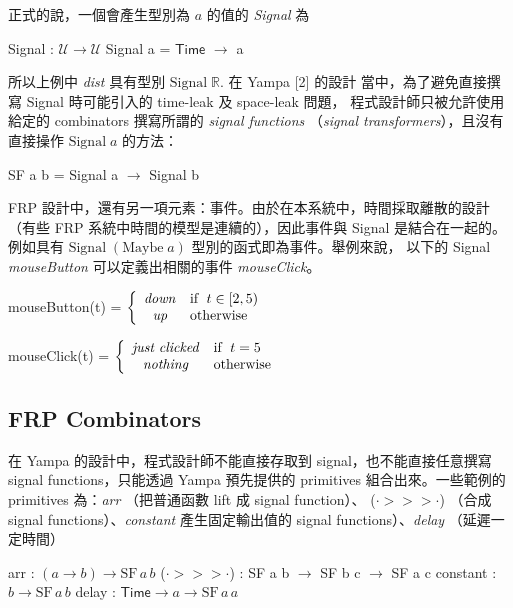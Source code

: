 \documentclass{article}
\newcommand{\Time}{\mathsf{Time}}
\newcommand{\R}{\mathbb{R}}
\newcommand{\U}{\mathcal{U}}
\begin{document}
  正式的說，一個會產生型別為 $a$ 的值的 \emph{Signal} 為

  \begin{code}
  Signal : $\U\to\U$
  Signal a = $\Time$ $\to$ a
  \end{code}

  所以上例中 \textit{dist} 具有型別 $\text{Signal}\; \R$. 在 Yampa [2] 的設計
  當中，為了避免直接撰寫 Signal 時可能引入的 time-leak 及 space-leak 問題，
  程式設計師只被允許使用給定的 combinators 撰寫所謂的 \emph{signal functions}
  （\emph{signal transformers}），且沒有直接操作 $\text{Signal}\; a$ 的方法：

  \begin{code}
  SF a b = Signal a $\to$ Signal b
  \end{code}

  FRP 設計中，還有另一項元素：事件。由於在本系統中，時間採取離散的設計
  （有些 FRP 系統中時間的模型是連續的），因此事件與 Signal 是結合在一起的。
  例如具有 $\text{Signal}\;(\text{Maybe}\;a)$ 型別的函式即為事件。舉例來說，
  以下的 Signal \textit{mouseButton} 可以定義出相關的事件
  \textit{mouseClick}。

  \begin{code}
  mouseButton(t) = $\displaystyle \left\{ \begin{array}{cl} \mathit{down} & \text{if\; } t\in [2,5) \\ \mathit{up} & \text{otherwise} \end{array} \right.$

  mouseClick(t) = $\displaystyle \left\{ \begin{array}{cl} \mathit{just\; clicked} & \text{if\; } t=5 \\ \mathit{nothing} & \text{otherwise} \end{array} \right.$
  \end{code}


  \subsection{FRP Combinators}

  在 Yampa 的設計中，程式設計師不能直接存取到 signal，也不能直接任意撰寫
  signal functions，只能透過 Yampa 預先提供的 primitives 組合出來。一些範例的
  primitives 為：\textit{arr} （把普通函數 lift 成 signal function）、
  ($\cdot>\!\!>\!\!>\cdot$) （合成 signal functions）、\textit{constant}
  產生固定輸出值的 signal functions）、\textit{delay} （延遲一定時間）

  \begin{code}
  arr : $(a\to b)\to \text{SF}\,a\,b$
  ($\cdot>\!\!>\!\!>\cdot$) : SF a b $\to$ SF b c $\to$ SF a c
  constant : $b\to\text{SF}\,a\,b$
  delay : $\Time\to a\to\text{SF}\,a\,a$
  \end{code}
\end{document}
